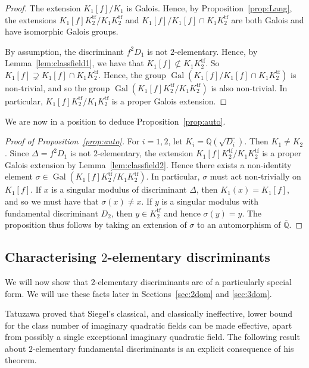\documentclass[12pt,a4paper,oneside]{amsart}
\DeclareMathOperator{\gal}{Gal}
\begin{document}
\begin{proof}
	The extension $K_1[f]/K_1$ is Galois. Hence, by Proposition~\ref{prop:Lang}, the extensions $K_1[f] K_2^\mathrm{tf} / K_1 K_2^\mathrm{tf}$ and $K_1[f] / K_1[f] \cap K_1 K_2^\mathrm{tf}$ are both Galois and have isomorphic Galois groups. 
	
	By assumption, the discriminant $f^2 D_1$ is not $2$-elementary. Hence, by Lemma~\ref{lem:classfield1}, we have that $K_1[f] \not \subset K_1 K_2^\mathrm{tf}$. So $K_1[f] \supsetneq K_1[f] \cap K_1 K_2^\mathrm{tf}$. Hence, the group $\gal(K_1[f] / K_1[f] \cap K_1 K_2^\mathrm{tf})$ is non-trivial, and so the group $\gal(K_1[f] K_2^\mathrm{tf} / K_1 K_2^\mathrm{tf})$ is also non-trivial. In particular, $K_1[f] K_2^\mathrm{tf} / K_1 K_2^\mathrm{tf}$ is a proper Galois extension.
\end{proof}

We are now in a position to deduce Proposition~\ref{prop:auto}.

\begin{proof}[Proof of Proposition~\ref{prop:auto}]
    For $i=1, 2$, let $K_i = \mathbb{Q}(\sqrt{D_i})$. Then $K_1 \neq K_2$. Since $\Delta = f^2 D_1$ is not $2$-elementary, the extension $K_1[f] K_2^\mathrm{tf} / K_1 K_2^\mathrm{tf}$ is a proper Galois extension by Lemma~\ref{lem:classfield2}. Hence there exists a non-identity element $\sigma \in \gal(K_1[f] K_2^\mathrm{tf} / K_1 K_2^\mathrm{tf})$. In particular, $\sigma$ must act non-trivially on $K_1[f]$. If $x$ is a singular modulus of discriminant $\Delta$, then $K_1(x) = K_1[f]$, and so we must have that $\sigma(x) \neq x$. If $y$ is a singular modulus with fundamental discriminant $D_2$, then $y \in K_2^\mathrm{tf}$ and hence $\sigma(y) = y$. The proposition thus follows by taking an extension of $\sigma$ to an automorphism of $\overline{\mathbb Q}$. 
\end{proof}
	
	

	

    \subsection{Characterising \texorpdfstring{$2$}{2}-elementary discriminants}\label{sec:2elem}

    We will now show that $2$-elementary discriminants are of a particularly special form.
We will use these facts later in Sections~\ref{sec:2dom} and \ref{sec:3dom}.
    
        Tatuzawa \cite[Th.~2]{Tatuzawa51} proved that Siegel's \cite[(1)]{Siegel35} classical, and classically ineffective, lower bound for the class number of imaginary quadratic fields can be made effective, apart from possibly a single exceptional imaginary quadratic field. The following result about $2$-elementary fundamental discriminants is an explicit consequence of his theorem.
\end{document}
